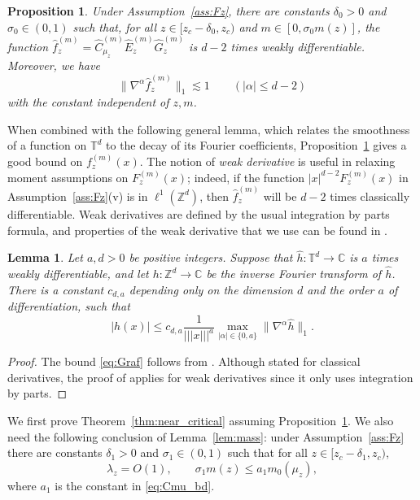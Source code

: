 \documentclass[11pt,hidelinks]{article}
\theoremstyle{plain}
\newtheorem{lemma}[theorem]{Lemma}
\newtheorem{proposition}[theorem]{Proposition}
\numberwithin{equation}{section}
\newcommand{\Z}{\mathbb{Z}}
\newcommand{\C}{\mathbb{C}}
\newcommand{\T}{\mathbb{T}}
\newcommand{\grad}{\nabla}
\renewcommand{\(}{\left(}
\renewcommand{\)}{\right)}
\newcommand{\1}{\mathds{1}}
\providecommand{\abs}[1]{\lvert#1\rvert}
\providecommand{\bignorm}[1]{\big\lVert#1\big\rVert}
\newcommand{\mz}{m(z)}
\newcommand{\muz}{{\mu_z}}
\newcommand{\supm}{^{(m)}}
\newcommand{\veee}[1]{|\!|\!|#1|\!|\!|}
\newcommand{\xvee}{\veee{x}}
\begin{document}
\begin{proposition} \label{prop:f}
Under Assumption~\ref{ass:Fz}, 
there are constants $\delta_0 >0$ and $\sigma_0 \in (0,1)$
such that, for all $z \in [ z_c - \delta_0, z_c )$ and $m \in [0, \sigma_0 \mz]$, 
the function $\hat f_z\supm = \hat C_\muz\supm \hat E_z\supm \hat G_z\supm$ is $d-2$ times weakly differentiable.
Moreover, we have 
\begin{equation} \label{eq:f_alpha}
\bignorm{ \grad^\alpha \hat f_z\supm }_1 \lesssim 1
	\qquad (\abs \alpha \le d-2)
\end{equation}
with the constant independent of $z,m$.
\end{proposition}


When combined with the following general lemma, which relates the smoothness of a function on $\T^d$ to the decay of its Fourier coefficients, Proposition~\ref{prop:f} gives a good bound on $f_z\supm(x)$. 
The notion of \emph{weak derivative} is useful in relaxing moment assumptions on $F_z\supm(x)$; 
indeed, if the function $\abs x^{d-2} F_z\supm(x)$ in Assumption~\ref{ass:Fz}(v) is in $\ell^1(\Z^d)$, then $\hat f_z\supm$ will be $d-2$ times classically differentiable. 
Weak derivatives are defined by the usual integration by parts formula, and properties of the weak derivative that we use can be found in \cite[Appendix~A]{LS24a}.

\begin{lemma}
\label{lem:fourier}
Let $a,d>0$ be positive integers.
Suppose that $\hat h : \T^d \to \C$ is  $a$ times weakly differentiable,
and let $h : \Z^d \to \C$
be the inverse Fourier transform of $\hat h$.
There is a constant $c_{d,a}$ depending only on the dimension $d$ and the
order $a$ of differentiation, such that
\begin{equation}
\label{eq:Graf}
    |h(x)|
    \le
    c_{d,a} \frac{1}{\xvee^a}
    \max_{|\alpha| \in \{0,a\}}\|\grad^\alpha \hat h\|_1 .
\end{equation}
\end{lemma}

\begin{proof}
The bound \eqref{eq:Graf} follows from
\cite[Corollary~3.3.10]{Graf14}.
Although stated for classical derivatives, the proof of \cite[Corollary~3.3.10]{Graf14}
applies for weak derivatives since it only uses integration by parts.
\end{proof}

We first prove Theorem~\ref{thm:near_critical} assuming Proposition~\ref{prop:f}.
We also need the following conclusion of Lemma~\ref{lem:mass}:
under Assumption~\ref{ass:Fz} there are constants $\delta_1 >0$ and $\sigma_1 \in (0,1)$ such that for all $z \in [z_c - \delta_1, z_c)$,
\begin{equation} \label{eq:mass_claim}
\lambda_z = O(1), \qquad
\sigma_1 m(z) \le a_1 m_0(\mu_z),
\end{equation}
where $a_1$ is the constant in \eqref{eq:Cmu_bd}. 
\end{document}
